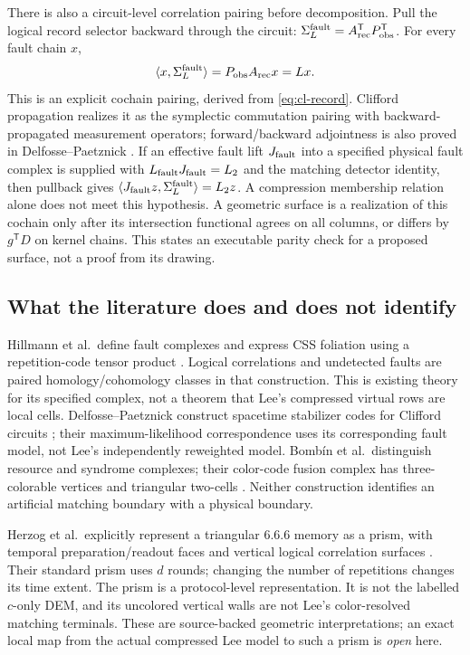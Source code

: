 There is also a circuit-level correlation pairing before decomposition.
Pull the logical record selector backward through the circuit:
$\Sigma_L^{\rm fault}=A_{\rm rec}^{\mathsf T}P_{\rm obs}^{\mathsf T}$.
For every fault chain $x$,
\[
 \langle x,\Sigma_L^{\rm fault}\rangle
 =P_{\rm obs}A_{\rm rec}x=Lx.                 \label{eq:cl-pairing}
\]
This is an explicit cochain pairing, derived from \eqref{eq:cl-record}.
Clifford propagation realizes it as the symplectic commutation pairing
with backward-propagated measurement operators; forward/backward
adjointness is also proved in Delfosse--Paetznick
\cite[Proposition~3, Sec.~3.4]{SpacetimeCodes}.
If an effective fault lift $J_{\rm fault}$ into a specified physical fault
complex is supplied with $L_{\rm fault}J_{\rm fault}=L_2$ and the matching
detector identity, then pullback gives
$\langle J_{\rm fault}z,\Sigma_L^{\rm fault}\rangle=L_2z$.
A compression membership relation alone does not meet this hypothesis.
A geometric surface is a realization of this cochain only after its
intersection functional agrees on all columns, or differs by $g^{\mathsf T}D$
on kernel chains. This states an executable parity check for a proposed
surface, not a proof from its drawing.

\subsection{What the literature does and does not identify}
Hillmann et al.\ define fault complexes and express CSS foliation using
a repetition-code tensor product \cite[Eqs.~(4)--(6), p.~2]{FaultComplex}.
Logical correlations and undetected faults are paired homology/cohomology
classes in that construction. This is existing theory for its specified
complex, not a theorem that Lee's compressed virtual rows are local cells.
Delfosse--Paetznick construct spacetime stabilizer codes for Clifford
circuits \cite[Theorems~1--3]{SpacetimeCodes}; their maximum-likelihood
correspondence uses its corresponding fault model, not Lee's independently
reweighted model. Bomb\'in et al.\ distinguish resource and syndrome
complexes; their color-code fusion complex has three-colorable vertices
and triangular two-cells \cite[Appendix~F, Definition~7]{FaultTolerant}.
Neither construction identifies an artificial matching boundary with a
physical boundary.

Herzog et al.\ explicitly represent a triangular 6.6.6 memory as a prism,
with temporal preparation/readout faces and vertical logical correlation
surfaces \cite[Sec.~III.A--B, Figs.~5--6]{ColorPipes}. Their standard prism
uses $d$ rounds; changing the number of repetitions changes its time
extent. The prism is a protocol-level representation. It is not the
labelled $c$-only DEM, and its uncolored vertical walls are not Lee's
color-resolved matching terminals. These are source-backed geometric
interpretations; an exact local map from the actual compressed Lee model
to such a prism is \emph{open} here.


